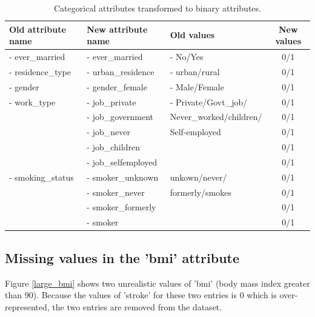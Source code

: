 \begin{table}[H]\begin{tabular}{|lllc|}
\hline
\textbf{Old attribute name} & \textbf{New attribute name} & \textbf{Old values} & \textbf{New values} \\ \hline \hline
- ever\_married   & - ever\_married     & - No/Yes                & 0/1 \\ \hline
- residence\_type & - urban\_residence  & - urban/rural           & 0/1 \\ \hline
- gender          & - gender\_female    & - Male/Female           & 0/1 \\ \hline
- work\_type      & - job\_private      & - Private/Govt\_job/    & 0/1 \\
                  & - job\_government   & Never\_worked/children/ & 0/1 \\
                  & - job\_never        & Self-employed           & 0/1 \\
                  & - job\_children     &                         & 0/1 \\
                  & - job\_selfemployed &                         & 0/1 \\ \hline
- smoking\_status & - smoker\_unknown   & unkown/never/           & 0/1 \\
                  & - smoker\_never     & formerly/smokes         & 0/1 \\
                  & - smoker\_formerly  &                         & 0/1 \\
                  & - smoker            &                         & 0/1 \\ \hline
\end{tabular}
\caption{Categorical attributes transformed to binary attributes.}
\label{table_new_attributes}
\end{table}

\subsection{Missing values in the 'bmi' attribute}
Figure \ref{large_bmi} shows two unrealistic values of 'bmi' (body mass index greater than 90). 
Because the values of 'stroke' for these two entries is 0 which is over-represented, the two entries 
are removed from the dataset.\\

